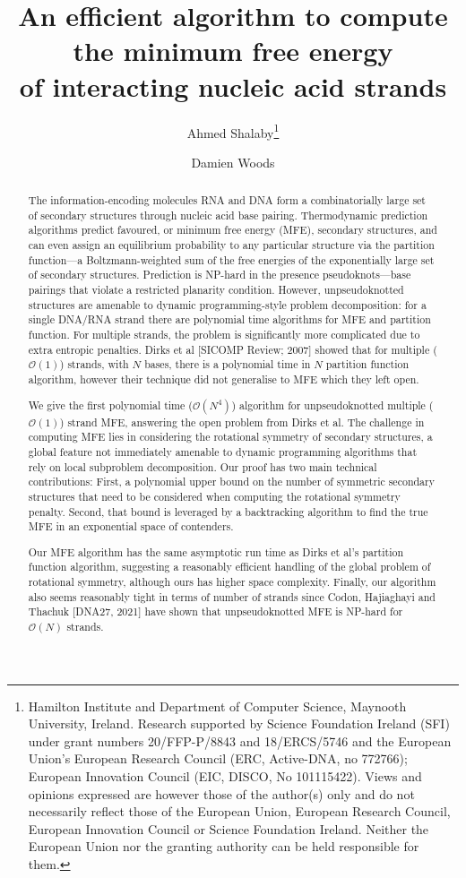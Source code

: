 \documentclass[11pt,letterpaper]{article}  \usepackage[margin=1in]{geometry}
\title{\Large An efficient algorithm to compute the minimum free energy\\ of interacting nucleic acid strands
}
\author{Ahmed Shalaby\thanks{Hamilton Institute and Department of Computer Science, Maynooth University, Ireland. Research supported by Science Foundation Ireland (SFI) under grant numbers 20/FFP-P/8843 and 18/ERCS/5746 and the European Union's European Research Council (ERC, Active-DNA, no 772766); European Innovation Council  (EIC, DISCO, No 101115422). Views and opinions expressed are however those of the author(s) only and do not necessarily reflect those of the European Union, European Research Council,  European Innovation Council or Science Foundation Ireland. Neither the European Union nor the granting authority can be held responsible for them.} 
\and Damien Woods\footnotemark[1]}
\date{}
\theoremstyle{definition}  \newtheorem{Definition}[theorem]{Definition}
\begin{document}
	\maketitle
	\pagestyle{plain}
	
	\begin{abstract} \baselineskip=11pt 
The information-encoding molecules RNA and DNA form a combinatorially large set of secondary structures through nucleic acid base pairing.  Thermodynamic prediction algorithms predict favoured, or minimum free energy (MFE), secondary structures, and can even assign an equilibrium probability to any particular structure via the partition function---a Boltzmann-weighted sum of the free energies of the exponentially large set of secondary structures.  Prediction is NP-hard in the presence pseudoknots---base pairings that violate a restricted planarity condition.  However, unpseudoknotted structures are amenable to dynamic programming-style problem decomposition:  for a single DNA/RNA strand there are polynomial time algorithms for MFE and partition function.  For multiple strands, the problem is significantly more complicated due to extra entropic penalties.  Dirks et al [SICOMP Review; 2007] showed that for multiple ($\mathcal{O}(1)$) strands, with $N$ bases, there is a polynomial time in $N$ partition function algorithm, however their technique did not generalise to  MFE which they left open. 
	
	We give the first polynomial time ($\mathcal{O}(N^4)$) algorithm   for unpseudoknotted multiple ($\mathcal{O}(1)$) strand MFE, answering the open problem from Dirks et al.  The challenge in computing MFE lies in considering the rotational symmetry of secondary structures, a global feature not immediately amenable to dynamic programming algorithms that rely on local subproblem decomposition.  Our proof has two main technical contributions:  First, a polynomial upper bound on the number of symmetric secondary structures that need to be considered when computing the rotational symmetry penalty. Second, that bound is leveraged by a backtracking algorithm to find the true MFE in an exponential space of contenders. 
	
	Our MFE algorithm has the same asymptotic run time as Dirks et al's partition function algorithm,  suggesting a reasonably efficient handling of the global problem of rotational symmetry, although ours has higher space complexity.  Finally, our algorithm also seems reasonably tight in terms of number of strands since Codon, Hajiaghayi and Thachuk [DNA27, 2021] have shown  that unpseudoknotted MFE is NP-hard for $\mathcal{O}(N)$ strands. 
\end{abstract} 	
\end{document}
